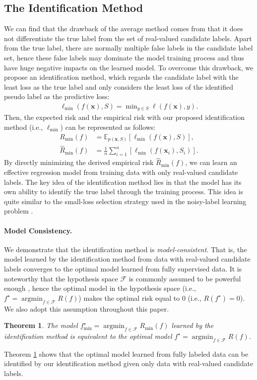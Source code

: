 \documentclass[letterpaper]{article} %
\newtheorem{thm}{Theorem}
\newcommand{\argmin}{\mathop{\arg\min}}
\begin{document}
\subsection{The Identification Method}
We can find that the drawback of the average method comes from that it does not differentiate the true label from the set of real-valued candidate labels. Apart from the true label, there are normally multiple false labels in the candidate label set, hence these false labels may dominate the model training process and thus have huge negative impacts on the learned model. To overcome this drawback, we propose an identification method, which regards the candidate label with the least loss as the true label and only considers the least loss of the identified pseudo label as the predictive loss:
\begin{gather}
\label{idt}
\ell_{\mathrm{min}}(f(\bm{x}), S)=\min\nolimits_{y\in S}\ell(f(\bm{x}), y).
\end{gather}
Then, the expected risk and the empirical risk with our proposed identification method (i.e., $\ell_{\mathrm{min}}$) can be represented as follows:
\begin{align}
\nonumber
R_{\mathrm{min}}(f)&=\mathbb{E}_{p(\bm{x}, S)}[\ell_{\mathrm{min}}(f(\bm{x}),S)],\\
\label{min_empirical_risk}
\widehat{R}_{\mathrm{min}}(f)&=\frac{1}{n}\sum\nolimits_{i=1}^n[\ell_{\mathrm{min}}(f(\bm{x}_i),S_i)].
\end{align}
By directly minimizing the derived empirical risk $\widehat{R}_{\mathrm{min}}(f)$, we can learn an effective regression model from training data with only real-valued candidate labels. The key idea of the identification method lies in that the model has its own ability to identify the true label through the training process. This idea is quite similar to the small-loss selection strategy used in the noisy-label learning problem \cite{han2018co,wei2020combating}.
\paragraph{Model Consistency.} We demonstrate that the identification method is \emph{model-consistent}. That is, the model learned by the identification method from data with real-valued candidate labels converges to the optimal model learned from fully supervised data. It is noteworthy that the hypothesis space $\mathcal{F}$ is commonly assumed to be powerful enough \cite{lv2020progressive}, hence the optimal model in the hypothesis space (i.e., $f^\star = \argmin_{f\in\mathcal{F}}{R}(f)$) makes the optimal risk equal to 0 (i.e., $R(f^\star)=0$). We also adopt this assumption throughout this paper.
\begin{thm}
\label{thm1}
The model $f^\star_{\mathrm{min}}=\argmin_{f\in\mathcal{F}}R_{\mathrm{min}}(f)$ learned by the identification method is equivalent to the optimal model $f^\star = \argmin_{f\in\mathcal{F}}{R}(f)$.
\end{thm}
Theorem \ref{thm1} shows that the optimal model learned from fully labeled data can be identified by our identification method given only data with real-valued candidate labels.
\end{document}
